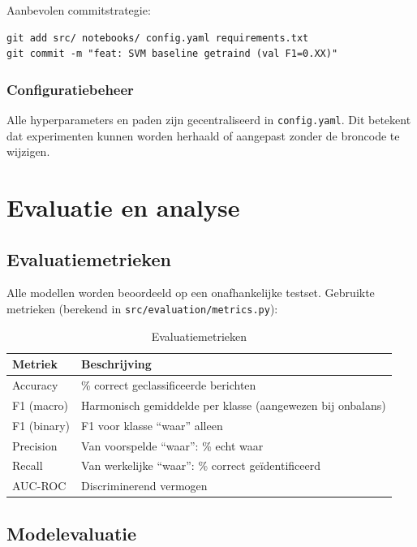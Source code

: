 Aanbevolen commitstrategie:

\begin{verbatim}
git add src/ notebooks/ config.yaml requirements.txt
git commit -m "feat: SVM baseline getraind (val F1=0.XX)"
\end{verbatim}

\subsection{Configuratiebeheer}

Alle hyperparameters en paden zijn gecentraliseerd in \texttt{config.yaml}.
Dit betekent dat experimenten kunnen worden herhaald of aangepast zonder
de broncode te wijzigen.

\chapter{Evaluatie en analyse}\label{ch:evaluatie}

\section{Evaluatiemetrieken}

Alle modellen worden beoordeeld op een onafhankelijke testset. Gebruikte
metrieken (berekend in \texttt{src/evaluation/metrics.py}):

\begin{table}[H]
\centering
\caption{Evaluatiemetrieken}
\begin{tabular}{ll}
\toprule
\textbf{Metriek} & \textbf{Beschrijving} \\
\midrule
Accuracy & \% correct geclassificeerde berichten \\
F1 (macro) & Harmonisch gemiddelde per klasse (aangewezen bij onbalans) \\
F1 (binary) & F1 voor klasse ``waar'' alleen \\
Precision & Van voorspelde ``waar'': \% echt waar \\
Recall & Van werkelijke ``waar'': \% correct geïdentificeerd \\
AUC-ROC & Discriminerend vermogen \\
\bottomrule
\end{tabular}
\end{table}

\section{Modelevaluatie}

